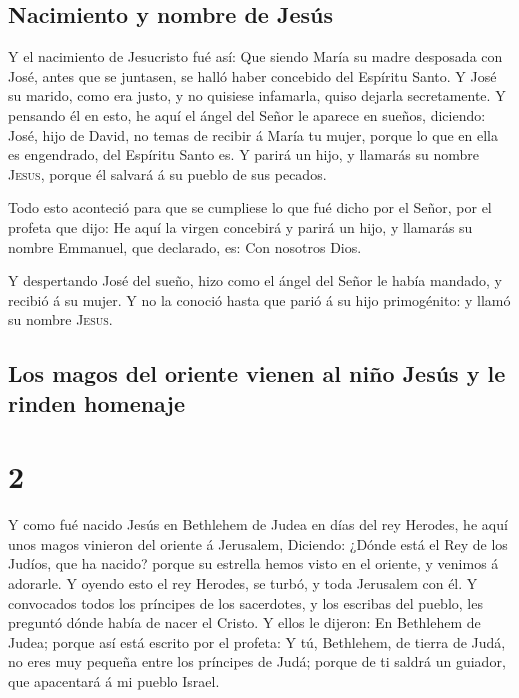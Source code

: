 \hypertarget{nacimiento-y-nombre-de-jesuxfas}{%
\subsection{Nacimiento y nombre de
Jesús}\label{nacimiento-y-nombre-de-jesuxfas}}

 Y el nacimiento de Jesucristo fué así: Que siendo María
su madre desposada con José, antes que se juntasen, se halló haber
concebido del Espíritu Santo.  Y José su marido, como era
justo, y no quisiese infamarla, quiso dejarla secretamente.
 Y pensando él en esto, he aquí el ángel del Señor le
aparece en sueños, diciendo: José, hijo de David, no temas de recibir á
María tu mujer, porque lo que en ella es engendrado, del Espíritu Santo
es.  Y parirá un hijo, y llamarás su nombre
\textsc{Jesus}, porque él salvará á su pueblo de sus pecados.

 Todo esto aconteció para que se cumpliese lo que fué
dicho por el Señor, por el profeta que dijo:  He aquí la
virgen concebirá y parirá un hijo, y llamarás su nombre Emmanuel, que
declarado, es: Con nosotros Dios.

 Y despertando José del sueño, hizo como el ángel del
Señor le había mandado, y recibió á su mujer.  Y no la
conoció hasta que parió á su hijo primogénito: y llamó su nombre
\textsc{Jesus}.

\hypertarget{los-magos-del-oriente-vienen-al-niuxf1o-jesuxfas-y-le-rinden-homenaje}{%
\subsection{Los magos del oriente vienen al niño Jesús y le rinden
homenaje}\label{los-magos-del-oriente-vienen-al-niuxf1o-jesuxfas-y-le-rinden-homenaje}}

\hypertarget{section-1}{%
\section{2}\label{section-1}}

 Y como fué nacido Jesús en Bethlehem de Judea en días del
rey Herodes, he aquí unos magos vinieron del oriente á Jerusalem,
 Diciendo: ¿Dónde está el Rey de los Judíos, que ha
nacido? porque su estrella hemos visto en el oriente, y venimos á
adorarle.  Y oyendo esto el rey Herodes, se turbó, y toda
Jerusalem con él.  Y convocados todos los príncipes de los
sacerdotes, y los escribas del pueblo, les preguntó dónde había de nacer
el Cristo.  Y ellos le dijeron: En Bethlehem de Judea;
porque así está escrito por el profeta:  Y tú, Bethlehem,
de tierra de Judá, no eres muy pequeña entre los príncipes de Judá;
porque de ti saldrá un guiador, que apacentará á mi pueblo Israel.

